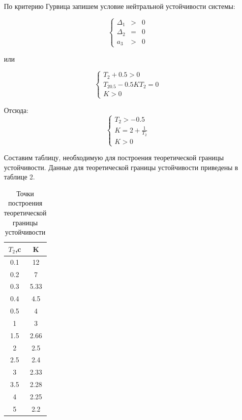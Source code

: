 \documentclass[a4paper, 11pt]{article}
\begin{document}
\par 
По критерию Гурвица запишем условие нейтральной устойчивости системы:

\begin{equation}
\left\{
\begin{matrix}
\Delta_1 & > & 0 \\
\Delta_2 & = & 0 \\
a_3 & > & 0
\end{matrix}
\right. 
\end{equation}
 
\par 
или

\begin{equation}
\left\{
\begin{matrix}
T_2+0.5>0 \\
T_20.5-0.5KT_2=0 \\
K>0
\end{matrix}
\right. 
\end{equation}

\par 
Отсюда:
\begin{equation}
\left\{
\begin{matrix}
T_2>-0.5 \\
\displaystyle K=2+\frac{1}{T_2} \\
K>0
\end{matrix}
\right. 
\end{equation}

\par 
Составим таблицу, необходимую для построения теоретической границы устойчивости. Данные для теоретической границы устойчивости приведены в таблице 2.

\newpage
\begin{table}
\caption{Точки построения теоретической границы устойчивости}
\begin{tabular}{|c|c|}
\hline
$T_2$,c & K \\
\hline
0.1 & 12 \\
\hline
0.2 & 7 \\
\hline
0.3 & 5.33 \\
\hline
0.4 & 4.5 \\
\hline
0.5 & 4 \\
\hline
1 & 3 \\
\hline
1.5 & 2.66 \\
\hline
2 & 2.5 \\
\hline
2.5 & 2.4 \\
\hline
3 & 2.33 \\
\hline
3.5 & 2.28 \\
\hline
4 & 2.25 \\
\hline
5 & 2.2 \\
\hline
\end{tabular}
\end{table}
\end{document}
